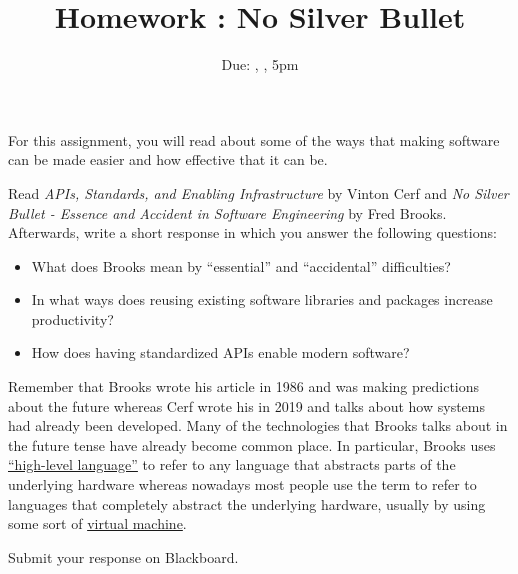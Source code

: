 \documentclass[12pt]{article}
\title{Homework \hwno: No Silver Bullet}
\date{Due: \dayofweekname{\duedate}{\duemonth}{\year}, \monthname[\duemonth] \duedate, 5pm}
\begin{document}
\maketitle

For this assignment, you will read about some of the ways that making software can be made easier and how effective that it can be.

Read \emph{APIs, Standards, and Enabling Infrastructure} by Vinton Cerf and \emph{No Silver Bullet - Essence and Accident in Software Engineering} by Fred Brooks.
Afterwards, write a short response in which you answer the following questions:

\begin{itemize}
	\item What does Brooks mean by ``essential'' and ``accidental'' difficulties?
	\item In what ways does reusing existing software libraries and packages increase productivity?
	\item How does having standardized APIs enable modern software?
\end{itemize}

Remember that Brooks wrote his article in 1986 and was making predictions about the future whereas Cerf wrote his in 2019 and talks about how systems had already been developed.
Many of the technologies that Brooks talks about in the future tense have already become common place.
In particular, Brooks uses \href{https://en.wikipedia.org/wiki/High-level_programming_language}{``high-level language''}  to refer to any language that abstracts parts of the underlying hardware whereas nowadays most people use the term to refer to languages that completely abstract the underlying hardware, usually by using some sort of \href{https://en.wikipedia.org/wiki/Virtual_machine}{virtual machine}.

Submit your response on Blackboard.
\end{document}
